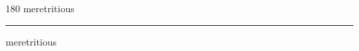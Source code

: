 
\begin{frame}
\begin{center}
\begin{turn}{180}
{\fontsize{2.5cm}{1em}\selectfont meretritious}
\end{turn}
\vspace{1em}\par  
\hrule
\vspace{1em}\par  
{\fontsize{2.5cm}{1em}\selectfont meretritious}
\end{center}
\end{frame}
